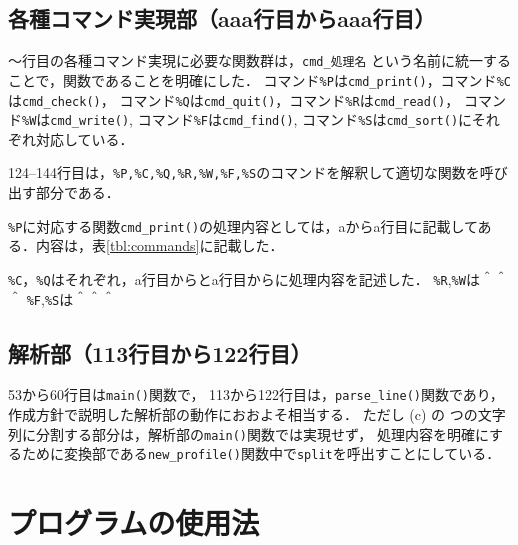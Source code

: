 \documentclass[a4j,11pt]{jarticle}
\begin{document}
\subsection{各種コマンド実現部（aaa行目からaaa行目）}
〜行目の各種コマンド実現に必要な関数群は，\verb|cmd_処理名| という名前に統一することで，関数であることを明確にした．
コマンド\verb|%P|は\verb|cmd_print()|，コマンド\verb|%C|は\verb|cmd_check()|，
コマンド\verb|%Q|は\verb|cmd_quit()|，コマンド\verb|%R|は\verb|cmd_read()|，
コマンド\verb|%W|は\verb|cmd_write()|, コマンド\verb|%F|は\verb|cmd_find()|, 
コマンド\verb|%S|は\verb|cmd_sort()|にそれぞれ対応している．

124--144行目は，\verb|%P,%C,%Q,%R,%W,%F,%S|のコマンドを解釈して適切な関数を呼び出す部分である．

\verb|%P|に対応する関数\verb|cmd_print()|の処理内容としては，aからa行目に記載してある．内容は，表\ref{tbl:commands}に記載した．

\verb|%C|，\verb|%Q|はそれぞれ，a行目からとa行目からに処理内容を記述した．
\verb|%R|,\verb|%W|は＾＾＾
\verb|%F|,\verb|%S|は＾＾＾

\subsection{解析部（113行目から122行目）}
53から60行目は\verb|main()|関数で，
113から122行目は，\verb|parse_line()|関数であり，作成方針で説明した解析部の動作におおよそ相当する．
ただし (c) の つの文字列に分割する部分は，解析部の\verb|main()|関数では実現せず，
処理内容を明確にするために変換部である\verb|new_profile()|関数中で\verb|split|を呼出すことにしている．

\section{プログラムの使用法}\label{sec:use}

\end{document}
